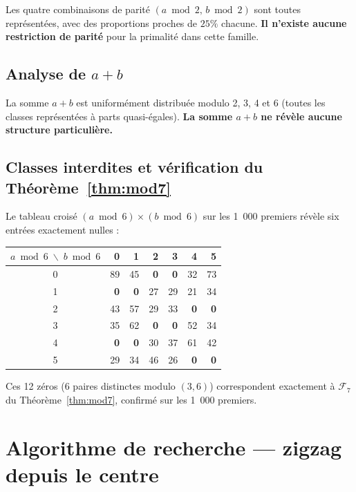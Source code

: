 \documentclass[12pt,a4paper]{article}
\theoremstyle{definition}
\begin{document}
Les quatre combinaisons de parité $(a \bmod 2,\, b \bmod 2)$ sont
toutes représentées, avec des proportions proches de $25\%$ chacune.
\textbf{Il n'existe aucune restriction de parité} pour la primalité
dans cette famille.

\subsection{Analyse de $a + b$}

La somme $a + b$ est uniformément distribuée modulo 2, 3, 4 et 6
(toutes les classes représentées à parts quasi-égales).
\textbf{La somme $a + b$ ne révèle aucune structure particulière.}

\subsection{Classes interdites et vérification du Théorème~\ref{thm:mod7}}

Le tableau croisé $(a \bmod 6) \times (b \bmod 6)$
sur les 1~000 premiers révèle six entrées exactement nulles :

\begin{center}
\renewcommand{\arraystretch}{1.2}
\begin{tabular}{c|rrrrrr}
  \toprule
  $a \!\bmod 6 \;\backslash\; b \bmod 6$
    & 0 & 1 & 2 & 3 & 4 & 5 \\
  \midrule
  0 & 89 & 45 & \textbf{0} & \textbf{0} & 32 & 73 \\
  1 & \textbf{0} & \textbf{0} & 27 & 29 & 21 & 34 \\
  2 & 43 & 57 & 29 & 33 & \textbf{0} & \textbf{0} \\
  3 & 35 & 62 & \textbf{0} & \textbf{0} & 52 & 34 \\
  4 & \textbf{0} & \textbf{0} & 30 & 37 & 61 & 42 \\
  5 & 29 & 34 & 46 & 26 & \textbf{0} & \textbf{0} \\
  \bottomrule
\end{tabular}
\end{center}

Ces 12 zéros (6 paires distinctes modulo $(3,6)$) correspondent exactement
à $\mathcal{F}_7$ du Théorème~\ref{thm:mod7}, confirmé sur les 1~000 premiers.

\section{Algorithme de recherche — zigzag depuis le centre}
\end{document}
